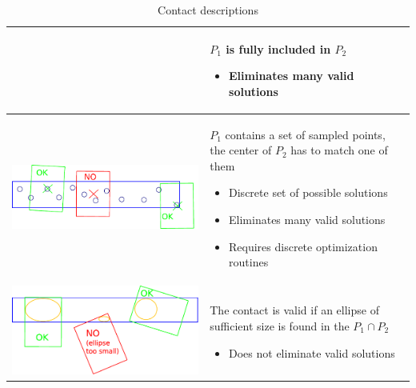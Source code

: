\begin{table}[h!]
\begin{tabular}{ c m{8cm} }
    &
    $P_1$ is fully included in $P_2$
    \begin{itemize}
      \item Eliminates many valid solutions
    \end{itemize}
    \\ \midrule
    \begin{minipage}{.4\textwidth}
      \includegraphics[width=\linewidth]{contact3.pdf}
    \end{minipage}
    &
    $P_1$ contains a set of sampled points, the center of $P_2$ has to match one of them
    \begin{itemize}
      \item Discrete set of possible solutions
      \item Eliminates many valid solutions
      \item Requires discrete optimization routines
    \end{itemize}
    \\ \midrule
    \begin{minipage}{.4\textwidth}
      \includegraphics[width=0.9\linewidth]{contact4.pdf}
    \end{minipage}
    &
    The contact is valid if an ellipse of sufficient size is found in
    the $P_1 \cap P_2$
    \begin{itemize}
      \item Does not eliminate valid solutions
    \end{itemize}
    \\ \bottomrule
  \end{tabular}
  \caption{Contact descriptions}\label{tbl:contact_description}
\end{table}

